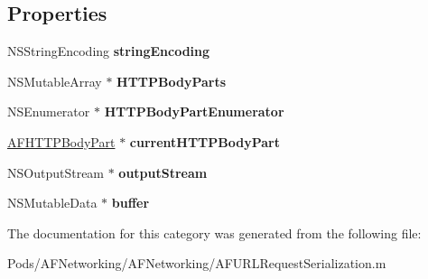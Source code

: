 \subsection*{Properties}
\begin{DoxyCompactItemize}
\item 
\mbox{\label{category_a_f_multipart_body_stream_07_08_a24375ab1dd4d3576eff24e5c9346c83c}} 
N\+S\+String\+Encoding {\bfseries string\+Encoding}
\item 
\mbox{\label{category_a_f_multipart_body_stream_07_08_a167d5df6c437a8a93b46de309d067198}} 
N\+S\+Mutable\+Array $\ast$ {\bfseries H\+T\+T\+P\+Body\+Parts}
\item 
\mbox{\label{category_a_f_multipart_body_stream_07_08_a2e5468c86b09e6a3cb14b812155f86ea}} 
N\+S\+Enumerator $\ast$ {\bfseries H\+T\+T\+P\+Body\+Part\+Enumerator}
\item 
\mbox{\label{category_a_f_multipart_body_stream_07_08_a95852aefe9011210705d91b29c7fa620}} 
\mbox{\hyperlink{interface_a_f_h_t_t_p_body_part}{A\+F\+H\+T\+T\+P\+Body\+Part}} $\ast$ {\bfseries current\+H\+T\+T\+P\+Body\+Part}
\item 
\mbox{\label{category_a_f_multipart_body_stream_07_08_a28c7caebc644034343559f3a09b6452a}} 
N\+S\+Output\+Stream $\ast$ {\bfseries output\+Stream}
\item 
\mbox{\label{category_a_f_multipart_body_stream_07_08_aa5694a5a64a23a3d20786e6eb0f50b9b}} 
N\+S\+Mutable\+Data $\ast$ {\bfseries buffer}
\end{DoxyCompactItemize}


The documentation for this category was generated from the following file\+:\begin{DoxyCompactItemize}
\item 
Pods/\+A\+F\+Networking/\+A\+F\+Networking/A\+F\+U\+R\+L\+Request\+Serialization.\+m\end{DoxyCompactItemize}
